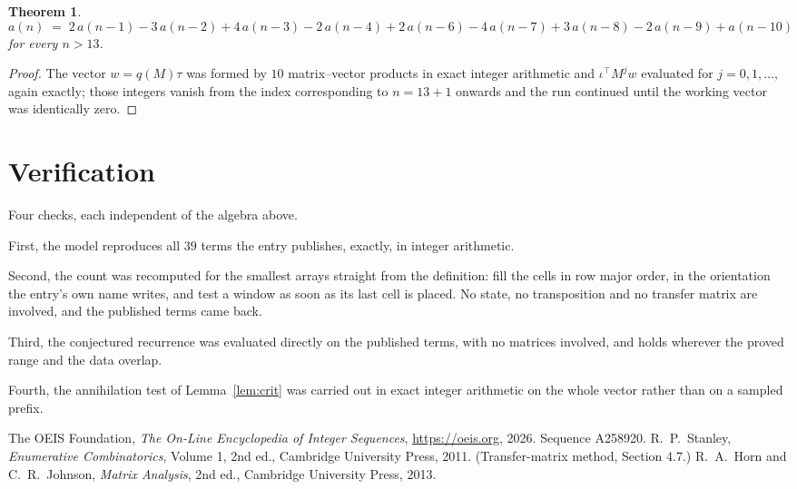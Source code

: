 \documentclass[11pt,a4paper]{article}
\theoremstyle{plain}
\newtheorem{theorem}{Theorem}
\theoremstyle{definition}
\begin{document}
\begin{theorem}
\[
a(n)\;=\;2\,a(n-1) - 3\,a(n-2) + 4\,a(n-3) - 2\,a(n-4) + 2\,a(n-6) - 4\,a(n-7) + 3\,a(n-8) - 2\,a(n-9) + a(n-10)
\]
for every $n>13$.
\end{theorem}

\begin{proof}
The vector $w=q(M)\tau$ was formed by $10$ matrix--vector products in exact integer
arithmetic and $\iota^{\!\top}M^{j}w$ evaluated for $j=0,1,\dots$, again exactly; those
integers vanish from the index corresponding to $n=13+1$ onwards and the run continued
until the working vector was identically zero.
\end{proof}

\section{Verification}

Four checks, each independent of the algebra above.

First, the model reproduces all $39$ terms the entry publishes, exactly, in integer
arithmetic.

Second, the count was recomputed for the smallest arrays straight from the definition: fill the
cells in row major order, in the orientation the entry's own name writes, and test a window as
soon as its last cell is placed. No state, no transposition and no transfer matrix are
involved, and the published terms came back.

Third, the conjectured recurrence was evaluated directly on the published terms, with no
matrices involved, and holds wherever the proved range and the data overlap.

Fourth, the annihilation test of Lemma~\ref{lem:crit} was carried out in exact integer
arithmetic on the whole vector rather than on a sampled prefix.

\begin{thebibliography}{9}
 The OEIS Foundation, \emph{The On-Line Encyclopedia of Integer
Sequences}, \url{https://oeis.org}, 2026. Sequence A258920.
 R.~P.~Stanley, \emph{Enumerative Combinatorics}, Volume 1, 2nd ed.,
Cambridge University Press, 2011. (Transfer-matrix method, Section 4.7.)
 R.~A.~Horn and C.~R.~Johnson, \emph{Matrix Analysis}, 2nd ed., Cambridge
University Press, 2013.
\end{thebibliography}
\end{document}
